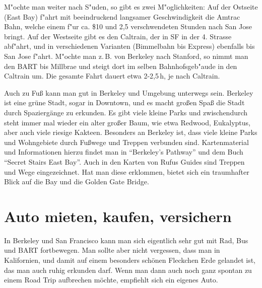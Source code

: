 \documentclass[a4paper]{scrreprt}
\begin{document}
M"ochte man weiter nach S"uden, so gibt es zwei M"oglichkeiten: Auf der Ostseite (East Bay) f"ahrt mit beeindruckend langsamer Geschwindigkeit die Amtrac Bahn, welche einem f"ur ca. \$10 und 2,5 verschwendeten Stunden nach San Jose bringt.
Auf der Westseite gibt es den Caltrain, der in SF in der 4. Strasse abf"ahrt, und in verschiedenen Varianten (Bimmelbahn bis Express) ebenfalls bis San Jose f"ahrt.
M"ochte man z.\,B. von Berkeley nach Stanford, so nimmt man den BART bis Millbrae und steigt dort im selben Bahnhofsgeb"aude in den Caltrain um.
Die gesamte Fahrt dauert etwa 2-2,5\,h, je nach Caltrain.

Auch zu Fuß kann man gut in Berkeley und Umgebung unterwegs sein. 
Berkeley ist eine grüne Stadt, sogar in Downtown, und es macht großen Spaß die Stadt durch Spaziergänge zu erkunden. 
Es gibt viele kleine Parks und zwischendurch steht immer mal wieder ein alter großer Baum, wie etwa Redwood, Eukalyptus, aber auch viele riesige Kakteen. 
Besonders an Berkeley ist, dass viele kleine Parks und Wohngebiete durch Fußwege und Treppen verbunden sind. 
Kartenmaterial und Informationen hierzu findet man in ``Berkeley's Pathway'' und dem Buch ``Secret Stairs East Bay''. 
Auch in den Karten von Rufus Guides sind Treppen und Wege eingezeichnet. 
Hat man diese erklommen, bietet sich ein traumhafter Blick auf die Bay und die Golden Gate Bridge.

\section{Auto mieten, kaufen, versichern}

In Berkeley und San Francisco kann man sich eigentlich sehr gut mit Rad, Bus und BART fortbewegen. 
Man sollte aber nicht vergessen, dass man in Kalifornien, und damit auf einem besonders schönen Fleckchen Erde gelandet ist, das man auch ruhig erkunden darf. 
Wenn man dann auch noch ganz spontan zu einem Road Trip aufbrechen möchte, empfiehlt sich ein eigenes Auto.
\end{document}
